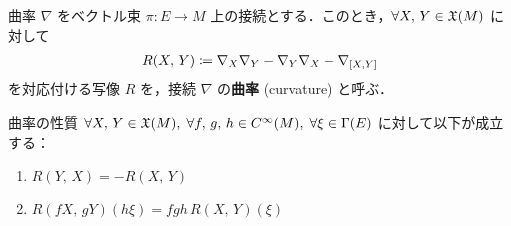 \documentclass[geometry_main]{subfiles}
\begin{document}
\begin{mydef}[label=def.curvature]{曲率}
	$\nabla$ をベクトル束 $ \pi \colon E \to M$ 上の接続とする．このとき，$\forall X,\, Y \in \mathfrak{X}(M)$ に対して
	\begin{align} 
		R(X,\, Y) \coloneqq \nabla_X \nabla_Y - \nabla_Y \nabla_X - \nabla_{\comm{X}{Y}}
	\end{align}
	を対応付ける写像 $R$ を，接続 $\nabla$ の\textbf{曲率} (curvature) と呼ぶ．
\end{mydef}

\begin{mylem}[]{曲率の性質}
	$\forall X,\, Y \in \mathfrak{X}(M),\; \forall f,\, g,\, h \in C^\infty(M),\; \forall \xi \in \Gamma(E)$ に対して以下が成立する：
	\begin{enumerate} 
		\item $R(Y,\, X) = - R(X,\, Y)$
		\item $R(fX,\, gY)(h\xi) = fgh\, R(X,\, Y)(\xi)$
	\end{enumerate}
\end{mylem}
\end{document}
